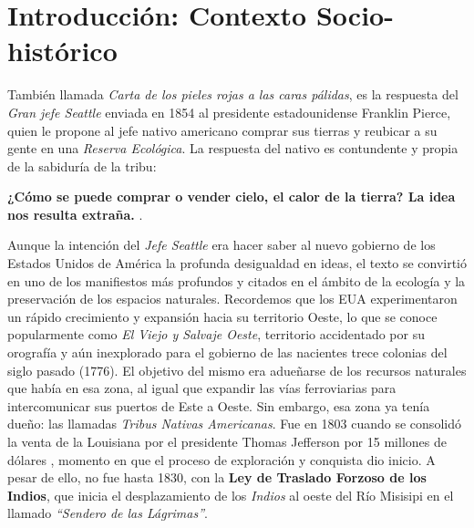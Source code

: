 
\section{Introducción: Contexto Socio-histórico}

También llamada \textit{Carta de los pieles rojas a las caras pálidas}, es la respuesta del
\textit{Gran jefe Seattle} enviada en 1854 al presidente estadounidense Franklin Pierce,
quien le propone al jefe nativo americano comprar sus tierras y reubicar a su gente en
una \textit{Reserva Ecológica}. La respuesta del nativo es contundente y propia de
la sabiduría de la tribu:

\textbf{¿Cómo se puede comprar o vender cielo, el calor de la tierra? La idea nos resulta
extraña.} \cite{perry1970home}.

Aunque la intención del \textit{Jefe Seattle} era hacer saber al nuevo gobierno de los Estados
Unidos de América la profunda desigualdad en ideas, el texto se convirtió en uno de los manifiestos
más profundos y citados en el ámbito de la ecología y la preservación de los espacios naturales.
Recordemos que los EUA experimentaron un rápido crecimiento y expansión hacia su territorio Oeste,
lo que se conoce popularmente como \textit{El Viejo y Salvaje Oeste}, territorio accidentado por
su orografía y aún inexplorado para el gobierno de las nacientes trece colonias del siglo
pasado (1776). El objetivo del mismo era adueñarse de los recursos naturales que había en esa
zona, al igual que expandir las vías ferroviarias para intercomunicar sus puertos de Este a Oeste.
Sin embargo, esa zona ya tenía dueño: las llamadas \textit{Tribus Nativas Americanas}. Fue en 1803
cuando se consolidó la venta de la Louisiana por el presidente Thomas Jefferson por 15 millones
de dólares \cite{turner1920frontier}, momento en que el proceso de exploración y conquista dio inicio. A pesar
de ello, no fue hasta 1830, con la \textbf{Ley de Traslado Forzoso de los Indios}, que inicia el
desplazamiento de los \textit{Indios} al oeste del Río Misisipi en el llamado \textit{``Sendero de las Lágrimas''}.

